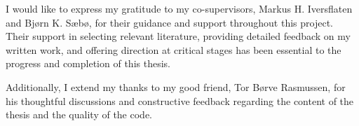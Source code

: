 I would like to express my gratitude to my co-supervisors, Markus H.
Iversflaten and Bjørn K. Sæbø, for their guidance and support throughout this
project. Their support in selecting relevant literature, providing detailed
feedback on my written work, and offering direction at critical stages has been
essential to the progress and completion of this thesis.

Additionally, I extend my thanks to my good friend, Tor Børve Rasmussen,
for his thoughtful discussions and constructive feedback regarding the content
of the thesis and the quality of the code.

